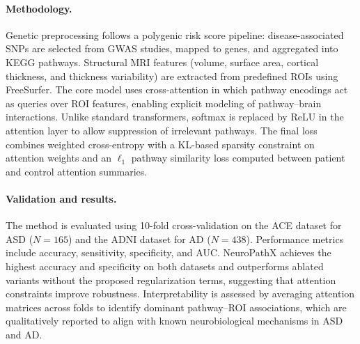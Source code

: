 \paragraph{Methodology.}
Genetic preprocessing follows a polygenic risk score pipeline: disease-associated SNPs are selected from GWAS studies, mapped to genes, and aggregated into KEGG pathways. Structural MRI features (volume, surface area, cortical thickness, and thickness variability) are extracted from predefined ROIs using FreeSurfer. The core model uses cross-attention in which pathway encodings act as queries over ROI features, enabling explicit modeling of pathway–brain interactions. Unlike standard transformers, softmax is replaced by ReLU in the attention layer to allow suppression of irrelevant pathways. The final loss combines weighted cross-entropy with a KL-based sparsity constraint on attention weights and an $\ell_1$ pathway similarity loss computed between patient and control attention summaries.

\paragraph{Validation and results.}
The method is evaluated using 10-fold cross-validation on the ACE dataset for ASD ($N=165$) and the ADNI dataset for AD ($N=438$). Performance metrics include accuracy, sensitivity, specificity, and AUC. NeuroPathX achieves the highest accuracy and specificity on both datasets and outperforms ablated variants without the proposed regularization terms, suggesting that attention constraints improve robustness. Interpretability is assessed by averaging attention matrices across folds to identify dominant pathway–ROI associations, which are qualitatively reported to align with known neurobiological mechanisms in ASD and AD.

